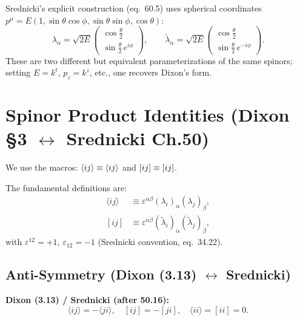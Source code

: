 Srednicki's explicit construction (eq.~60.5) uses spherical coordinates
$p^\mu=E(1,\sin\theta\cos\phi,\sin\theta\sin\phi,\cos\theta)$:
\begin{equation}
  \lambda_\alpha = \sqrt{2E}\begin{pmatrix}\cos\tfrac\theta2\\
    \sin\tfrac\theta2\,e^{i\phi}\end{pmatrix},
  \qquad
  \tilde\lambda_{\dot\alpha} = \sqrt{2E}\begin{pmatrix}\cos\tfrac\theta2\\
    \sin\tfrac\theta2\,e^{-i\phi}\end{pmatrix}.
  \tag{Sred 60.5}
\end{equation}
These are two different but equivalent parameterizations of the same spinors;
setting $E=k^t$, $p_z=k^z$, etc., one recovers Dixon's form.


\section{Spinor Product Identities (Dixon \S3 $\leftrightarrow$ Srednicki Ch.50)}
\label{sec:spinor-products}

We use the macros: $\langle ij\rangle\equiv\langle i j \rangle$ and $[ij]\equiv[ i j ]$.

The fundamental definitions are:
\begin{align}
  \langle ij\rangle &\equiv \varepsilon^{\alpha\beta}(\lambda_i)_\alpha(\lambda_j)_\beta,
  \tag{Sred 50.16 / Dixon 3.1} \\
  [ij] &\equiv \varepsilon^{\dot\alpha\dot\beta}(\tilde\lambda_i)_{\dot\alpha}(\tilde\lambda_j)_{\dot\beta},
  \tag{Sred 50.17 / Dixon 3.2}
\end{align}
with $\varepsilon^{12}=+1$, $\varepsilon_{12}=-1$ (Srednicki convention, eq.~34.22).

\subsection{Anti-Symmetry (Dixon (3.13) $\leftrightarrow$ Srednicki)}

\textbf{Dixon (3.13) / Srednicki (after 50.16):}
\begin{equation}
  \langle ij\rangle = -\langle ji\rangle, \quad [ij]=-[ji], \quad
  \langle ii\rangle=[ii]=0.
  \tag{Dixon 3.13}
\end{equation}

